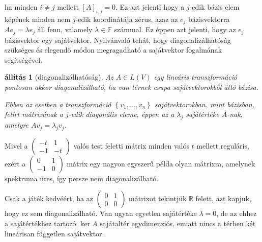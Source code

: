 \documentclass[a4paper, showtrims]{memoir}
\theoremstyle{plain}
\newtheorem{proposition}{állítás}[chapter]
\theoremstyle{remark}
\theoremstyle{definition}
\begin{document}
ha minden $i\neq j$ mellett $\left[ A \right]_{i,j}=0.$
Ez azt jelenti hogy a $j$-edik bázis elem képének minden nem $j$-edik koordinátája zérus,
azaz az $e_j$ bázisvektorra $Ae_j=\lambda e_j$ áll fenn,
valamely $\lambda\in\mathbb{F}$ számmal.
Ez éppen azt jelenti,
hogy az $e_j$ bázisvektor egy sajátvektor.
Nyilvánvaló tehát,
hogy diagonalizálhatóság szükséges és elegendő módon megragadható a sajátvektor fogalmának segítségével.
\begin{proposition}[diagonalizálhatóság]
	Az $A\in L\left( V \right)$ egy lineáris transzformáció
	pontosan akkor diagonalizálható,
	ha van térnek csupa sajátvektorokból álló bázisa.

	Ebben az esetben a transzformáció $\left\{ v_1,\ldots,v_n \right\}$ sajátvektorokban, mint bázisban,
    felírt mátrixának a $j$-edik diagonális eleme,
    éppen az a $\lambda_j$ sajátértéke $A$-nak,
    amelyre $Av_j=\lambda_jv_j$.
\end{proposition}
Mivel a
\begin{math}
	\begin{pmatrix}
		-t & 1 \\-1&-t
	\end{pmatrix}
\end{math}
valós test feletti mátrix minden valós $t$ mellett reguláris,
ezért a
\begin{math}
	\begin{pmatrix}
		0 & 1 \\-1&0
	\end{pmatrix}
\end{math}
mátrix egy nagyon egyszerű példa olyan mátrixra, amelynek spektruma üres,
így persze nem diagonalizálható.

Csak a játék kedvéért, ha az
\begin{math}
	\begin{pmatrix}
		0 & 1 \\0&0
	\end{pmatrix}
\end{math}
mátrixot tekintjük $\mathbb{R}$ felett,
azt kapjuk, hogy ez sem diagonalizálható.
Van ugyan egyetlen sajátértéke $\lambda=0$,
de az ehhez a sajátértékhez tartozó $\ker A$ sajátaltér egydimenziós,
emiatt nincs a térben két lineárisan független sajátvektor.
\end{document}
